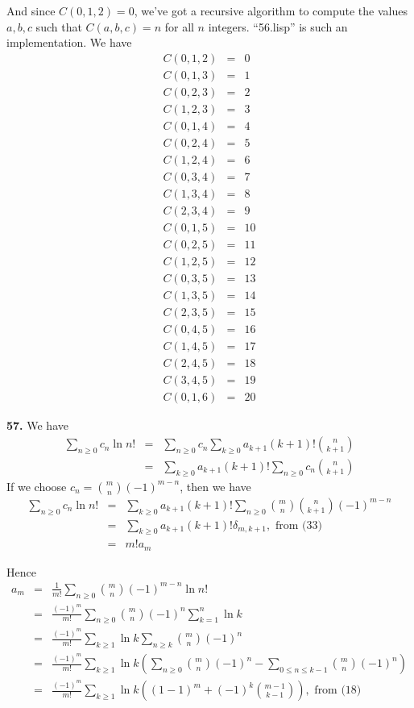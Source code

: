 \documentclass[a4paper,12pt]{article}
\newcommand{\newpar}[1]{\bigskip \noindent \textbf{#1.}}
\begin{document}
And since $C(0, 1, 2) = 0$, we've got a recursive algorithm to compute
the values $a, b, c$ such that $C(a, b, c) = n$ for all $n$ integers.
``56.lisp'' is such an implementation.  We have
\begin{eqnarray*}
  C(0, 1, 2) &=& 0 \\
  C(0, 1, 3) &=& 1 \\
  C(0, 2, 3) &=& 2 \\
  C(1, 2, 3) &=& 3 \\
  C(0, 1, 4) &=& 4 \\
  C(0, 2, 4) &=& 5 \\
  C(1, 2, 4) &=& 6 \\
  C(0, 3, 4) &=& 7 \\
  C(1, 3, 4) &=& 8 \\
  C(2, 3, 4) &=& 9 \\
  C(0, 1, 5) &=& 10 \\
  C(0, 2, 5) &=& 11 \\
  C(1, 2, 5) &=& 12 \\
  C(0, 3, 5) &=& 13 \\
  C(1, 3, 5) &=& 14 \\
  C(2, 3, 5) &=& 15 \\
  C(0, 4, 5) &=& 16 \\
  C(1, 4, 5) &=& 17 \\
  C(2, 4, 5) &=& 18 \\
  C(3, 4, 5) &=& 19 \\
  C(0, 1, 6) &=& 20
\end{eqnarray*}

\newpar{57} We have
\begin{eqnarray*}
  \sum_{n \ge 0} c_n \ln n! &=& \sum_{n \ge 0} c_n \sum_{k \ge 0}
  a_{k+1} (k+1)! {n \choose k+1} \\
  &=& \sum_{k\ge 0} a_{k+1}(k+1)!\sum_{n \ge 0} c_n {n \choose k+1}
\end{eqnarray*}
If we choose $c_n = {m \choose n} (-1)^{m-n}$, then we have
\begin{eqnarray*}
  \sum_{n\ge 0} c_n \ln n! &=& \sum_{k\ge 0}a_{k+1}(k+1)! \sum_{n\ge
    0} {m \choose n}{n \choose k+1} (-1)^{m-n} \\
  &=& \sum_{k\ge 0} a_{k+1}(k+1)! \delta_{m, k+1}, \mbox{ from (33)}\\
  &=& m! a_m
\end{eqnarray*}

Hence
\begin{eqnarray*}
  a_m &=& \frac{1}{m!} \sum_{n\ge 0} {m \choose n} (-1)^{m-n} \ln n!\\
  &=& \frac{(-1)^m}{m!} \sum_{n\ge 0} {m \choose n} (-1)^n
  \sum_{k=1}^n \ln k \\
  &=& \frac{(-1)^m}{m!} \sum_{k\ge 1} \ln k \sum_{n \ge k} {m \choose
    n}(-1)^n \\
  &=& \frac{(-1)^m}{m!} \sum_{k\ge 1} \ln k \left( \sum_{n \ge 0} {m
    \choose n}(-1)^n - \sum_{0 \le n \le k-1}{m \choose
    n}(-1)^n\right)\\
  &=& \frac{(-1)^m}{m!} \sum_{k\ge 1} \ln k \left( (1-1)^m + (-1)^k
      {m-1 \choose k-1}\right), \mbox{ from (18)}
\end{eqnarray*}
\end{document}
